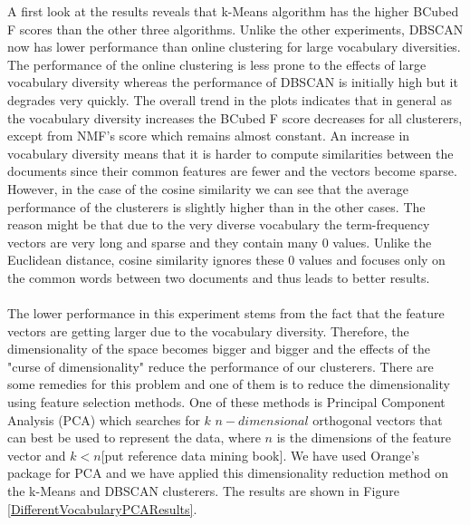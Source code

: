 A first look at the results reveals that k-Means algorithm has the higher BCubed F scores than the other three algorithms. Unlike the other experiments, DBSCAN now has lower performance than online clustering for large vocabulary diversities. The performance of the online clustering is less prone to the effects of large vocabulary diversity whereas the performance of DBSCAN is initially high but it degrades very quickly. The overall trend in the plots indicates that in general as the vocabulary diversity increases the BCubed F score decreases for all clusterers, except from NMF's score which remains almost constant. An increase in vocabulary diversity means that it is harder to compute similarities between the documents since their common features are fewer and the vectors become sparse. However, in the case of the cosine similarity we can see that the average performance of the clusterers is slightly higher than in the other cases. The reason might be that due to the very diverse vocabulary the term-frequency vectors are very long and sparse and they contain many 0 values. Unlike the Euclidean distance, cosine similarity ignores these 0 values and focuses only on the common words between two documents and thus leads to better results.\\\\
The lower performance in this experiment stems from the fact that the feature vectors are getting larger due to the vocabulary diversity. Therefore, the dimensionality of the space becomes bigger and bigger and the effects of the "curse of dimensionality" reduce the performance of our clusterers. There are some remedies for this problem and one of them is to reduce the dimensionality using feature selection methods. One of these methods is Principal Component Analysis (PCA) which searches for $k$ $n-dimensional$ orthogonal vectors that can best be used to represent the data, where $n$ is the dimensions of the feature vector and $k < n$[put reference data mining book]. We have used Orange's package for PCA and we have applied this dimensionality reduction method on the k-Means and DBSCAN clusterers. The results are shown in Figure \ref{DifferentVocabularyPCAResults}.\\\\ 
